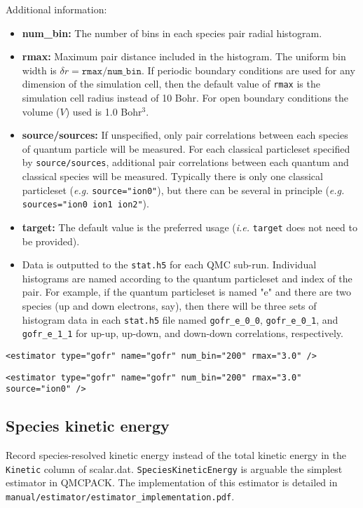 Additional information:
\begin{itemize}
  \item{\textbf{num\_bin:} The number of bins in each species pair radial histogram.}
  \item{\textbf{rmax:} Maximum pair distance included in the histogram.  The uniform bin width is $\delta r=\texttt{rmax/num\_bin}$.  If periodic boundary conditions are used for any dimension of the simulation cell, then the default value of \texttt{rmax} is the simulation cell radius instead of 10 Bohr.  For open boundary conditions the volume ($V$) used is 1.0 Bohr$^3$.}
  \item{\textbf{source/sources:} If unspecified, only pair correlations between each species of quantum particle will be measured.  For each classical particleset specified by \texttt{source/sources}, additional pair correlations between each quantum and classical species will be measured.  Typically there is only one classical particleset (\textit{e.g.} \texttt{source="ion0"}), but there can be several in principle (\textit{e.g.} \texttt{sources="ion0 ion1 ion2"}).}
  \item{\textbf{target:} The default value is the preferred usage (\textit{i.e.} \texttt{target} does not need to be provided).}
  \item{Data is outputted to the \texttt{stat.h5} for each QMC sub-run.  Individual histograms are named according to the quantum particleset and index of the pair.  For example, if the quantum particleset is named "e" and there are two species (up and down electrons, say), then there will be three sets of histogram data in each \texttt{stat.h5} file named \texttt{gofr\_e\_0\_0},  \texttt{gofr\_e\_0\_1}, and  \texttt{gofr\_e\_1\_1} for up-up, up-down, and down-down correlations, respectively.}
\end{itemize}

\begin{lstlisting}[caption=Pair correlation function estimator element.]
  <estimator type="gofr" name="gofr" num_bin="200" rmax="3.0" />
\end{lstlisting}
\begin{lstlisting}[caption=Pair correlation function estimator element with additional electron-ion correlations.]
  <estimator type="gofr" name="gofr" num_bin="200" rmax="3.0" source="ion0" />
\end{lstlisting}

\subsection{Species kinetic energy}
Record species-resolved kinetic energy instead of the total kinetic energy in the \verb|Kinetic| column of scalar.dat. \verb|SpeciesKineticEnergy| is arguable the simplest estimator in QMCPACK. The implementation of this estimator is detailed in \verb|manual/estimator/estimator_implementation.pdf|.


